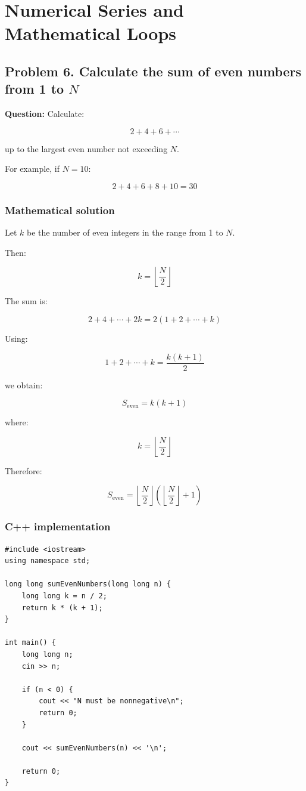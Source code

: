 \section{Numerical Series and Mathematical Loops}


\subsection{\textbf{Problem 6. Calculate the sum of even numbers from 1 to }$N$}

\textbf{Question:} Calculate:


\[
2+4+6+\cdots
\]


up to the largest even number not exceeding $N$.

For example, if $N=10$:


\[
2+4+6+8+10=30
\]


\subsubsection{Mathematical solution}

Let $k$ be the number of even integers in the range from 1 to $N$.

Then:


\[
k=\left\lfloor\frac N2\right\rfloor
\]


The sum is:


\[
2+4+\cdots+2k =2(1+2+\cdots+k)
\]


Using:


\[
1+2+\cdots+k=\frac{k(k+1)}2
\]


we obtain:


\[
\boxed{S_{\text{even}}=k(k+1)}
\]


where:


\[
\boxed{k=\left\lfloor\frac N2\right\rfloor}
\]


Therefore:


\[
\boxed{ S_{\text{even}} = \left\lfloor\frac N2\right\rfloor \left(\left\lfloor\frac N2\right\rfloor+1\right) }
\]


\subsubsection{C++ implementation}

\begin{lstlisting}[style=cppstyle]
#include <iostream>
using namespace std;

long long sumEvenNumbers(long long n) {
    long long k = n / 2;
    return k * (k + 1);
}

int main() {
    long long n;
    cin >> n;

    if (n < 0) {
        cout << "N must be nonnegative\n";
        return 0;
    }

    cout << sumEvenNumbers(n) << '\n';

    return 0;
}
\end{lstlisting}

